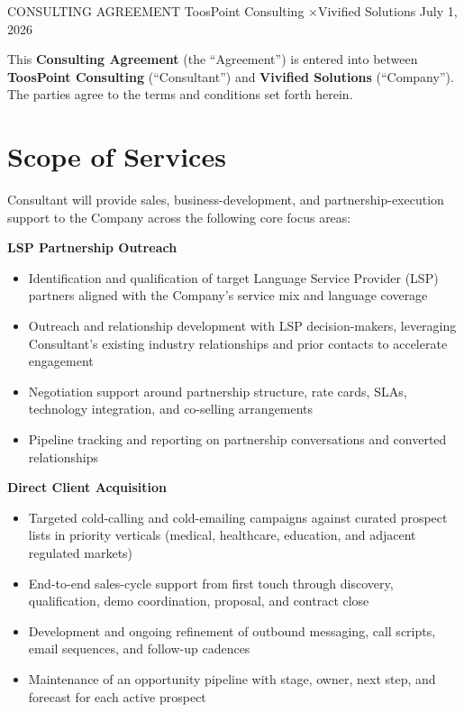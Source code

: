 \documentclass{toospoint}
\begin{document}
\contracttitle
  {CONSULTING AGREEMENT}
  {ToosPoint Consulting \quad×\quad Vivified Solutions}
  {July 1, 2026}

\begin{clausebox}
\sffamily\small
This \textbf{Consulting Agreement} (the ``Agreement'') is entered into between
\textbf{ToosPoint Consulting} (``Consultant'') and \textbf{Vivified Solutions}
(``Company''). The parties agree to the terms and conditions set forth herein.
\end{clausebox}

\vspace{10pt}

\section{Scope of Services}

Consultant will provide sales, business-development, and partnership-execution
support to the Company across the following core focus areas:

\vspace{4pt}
\noindent\textbf{\color{TPDark}LSP Partnership Outreach}
\begin{itemize}[leftmargin=1.5em, itemsep=2pt, topsep=2pt]
  \item Identification and qualification of target Language Service Provider (LSP) partners aligned with the Company's service mix and language coverage
  \item Outreach and relationship development with LSP decision-makers, leveraging Consultant's existing industry relationships and prior contacts to accelerate engagement
  \item Negotiation support around partnership structure, rate cards, SLAs, technology integration, and co-selling arrangements
  \item Pipeline tracking and reporting on partnership conversations and converted relationships
\end{itemize}

\vspace{4pt}
\noindent\textbf{\color{TPDark}Direct Client Acquisition}
\begin{itemize}[leftmargin=1.5em, itemsep=2pt, topsep=2pt]
  \item Targeted cold-calling and cold-emailing campaigns against curated prospect lists in priority verticals (medical, healthcare, education, and adjacent regulated markets)
  \item End-to-end sales-cycle support from first touch through discovery, qualification, demo coordination, proposal, and contract close
  \item Development and ongoing refinement of outbound messaging, call scripts, email sequences, and follow-up cadences
  \item Maintenance of an opportunity pipeline with stage, owner, next step, and forecast for each active prospect
\end{itemize}
\end{document}
